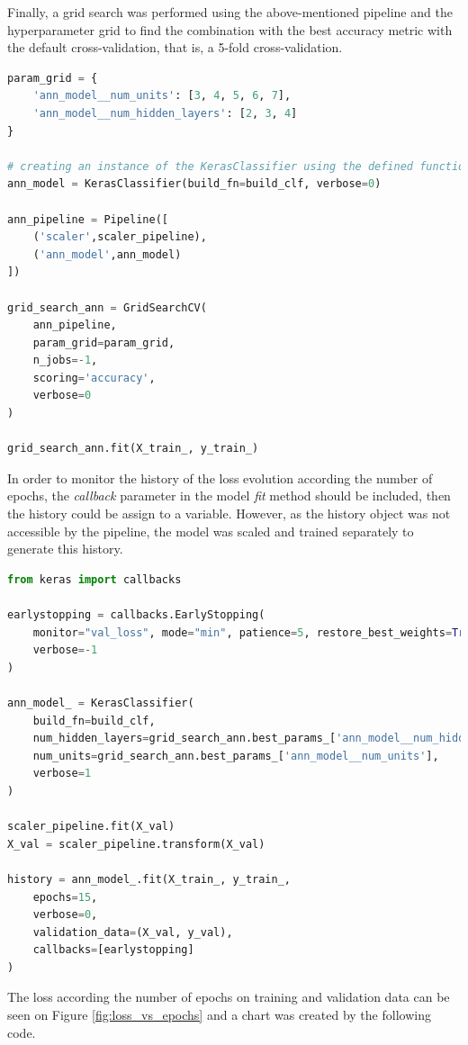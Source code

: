 \documentclass{article}
\begin{document}
Finally, a grid search was performed using the above-mentioned pipeline and the hyperparameter grid to find the combination with the best accuracy metric with the default cross-validation, that is, a 5-fold cross-validation.
\begin{lstlisting}[language=Python]
param_grid = {
    'ann_model__num_units': [3, 4, 5, 6, 7],
    'ann_model__num_hidden_layers': [2, 3, 4]
}

# creating an instance of the KerasClassifier using the defined function 
ann_model = KerasClassifier(build_fn=build_clf, verbose=0)

ann_pipeline = Pipeline([
    ('scaler',scaler_pipeline), 
    ('ann_model',ann_model)
])

grid_search_ann = GridSearchCV(
    ann_pipeline,
    param_grid=param_grid,
    n_jobs=-1,
    scoring='accuracy',
    verbose=0
)

grid_search_ann.fit(X_train_, y_train_)
\end{lstlisting}

In order to monitor the history of the loss evolution according the number of epochs, the \emph{callback} parameter in the model \emph{fit} method should be included, then the history could be assign to a variable. However, as the history object was not accessible by the pipeline, the model was scaled and trained separately to generate this history.

\begin{lstlisting}[language=Python]
from keras import callbacks

earlystopping = callbacks.EarlyStopping(
    monitor="val_loss", mode="min", patience=5, restore_best_weights=True, 
    verbose=-1
)

ann_model_ = KerasClassifier(
    build_fn=build_clf, 
    num_hidden_layers=grid_search_ann.best_params_['ann_model__num_hidden_layers'], 
    num_units=grid_search_ann.best_params_['ann_model__num_units'], 
    verbose=1
)

scaler_pipeline.fit(X_val)
X_val = scaler_pipeline.transform(X_val)

history = ann_model_.fit(X_train_, y_train_, 
    epochs=15, 
    verbose=0,
    validation_data=(X_val, y_val),
    callbacks=[earlystopping]
)
\end{lstlisting}

The loss according the number of epochs on training and validation data can be seen on Figure \ref{fig:loss_vs_epochs} and a chart was created by the following code.
\end{document}
